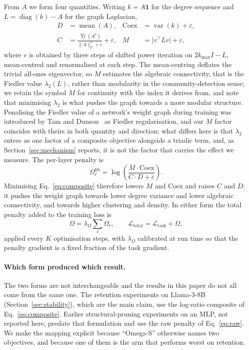 \documentclass[11pt,a4paper]{article}
\begin{document}
From $A$ we form four quantities. Writing $k = A\mathbf{1}$ for the degree
sequence and $L = \operatorname{diag}(k) - A$ for the graph Laplacian,
\begin{align}
  D &= \operatorname{mean}(A), &
  \mathrm{Coex} &= \operatorname{var}(k) + \varepsilon, \nonumber\\
  C &= \frac{\widehat{\operatorname{Tr}}(A^3)}{\lVert A\rVert_F^3 + \varepsilon}
      + \varepsilon, &
  M &= \bigl|v^\top L v\bigr| + \varepsilon,
\label{eq:factors}
\end{align}
where $v$ is obtained by three steps of shifted power iteration on
$2k_{\max}I - L$, mean-centred and renormalised at each step. The
mean-centring deflates the trivial all-ones eigenvector, so $M$ estimates the
algebraic connectivity, that is the Fiedler value $\lambda_2(L)$, rather than
modularity in the community-detection sense; we retain the symbol $M$ for
continuity with the index it derives from, and note that minimising
$\lambda_2$ is what pushes the graph towards a more modular structure.
Penalising the Fiedler value of a network's weight graph during training was
introduced by Tam and Dunson~\cite{tam2020} as Fiedler regularisation, and
our $M$ factor coincides with theirs in both quantity and direction; what
differs here is that $\lambda_2$ enters as one factor of a composite
objective alongside a triadic term, and, as Section~\ref{sec:mechanism}
reports, it is not the factor that carries the effect we measure. The
per-layer penalty is
\begin{equation}
  \Omega^{\text{lib}}_\ell =
  \log\!\left(\frac{M \cdot \mathrm{Coex}}{C \cdot D + \varepsilon}\right).
\label{eq:composite}
\end{equation}
Minimising Eq.~\ref{eq:composite} therefore lowers $M$ and $\mathrm{Coex}$ and
raises $C$ and $D$: it pushes the weight graph towards lower degree variance
and lower algebraic connectivity, and towards higher clustering and density.
In either form the total penalty added to the training loss is
\begin{equation}
  \Omega = \lambda_\Omega \sum_{\ell} \Omega_\ell, \qquad
  \mathcal{L}_{\text{total}} = \mathcal{L}_{\text{task}} + \Omega,
\end{equation}
applied every $K$ optimisation steps, with $\lambda_\Omega$ calibrated at run
time so that the penalty gradient is a fixed fraction of the task gradient.

\paragraph{Which form produced which result.} The two forms are not
interchangeable and the results in this paper do not all come from the same
one. The retention experiments on Llama-3-8B (Section~\ref{sec:stability}),
which are the main claim, use the log-ratio composite of
Eq.~\ref{eq:composite}. Earlier structural-pruning experiments on an MLP, not
reported here, predate that formulation and use the raw penalty of
Eq.~\ref{eq:raw}. We make the mapping explicit because
``Omega-S'' otherwise names two objectives, and because one of them is the
arm that performs worst on retention.
\end{document}
